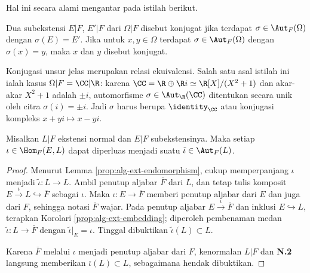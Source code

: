 Hal ini secara alami mengantar pada istilah berikut.
\begin{definition}
	Dua subekstensi $E|F$, $E'|F$ dari $\Omega|F$ disebut konjugat jika terdapat $\sigma \in \Aut_F(\Omega)$ dengan $\sigma(E)=E'$. Jika untuk $x, y \in \Omega$ terdapat $\sigma \in \Aut_F(\Omega)$ dengan $\sigma(x)=y$, maka $x$ dan $y$ disebut konjugat.
\end{definition}
Konjugasi unsur jelas merupakan relasi ekuivalensi. Salah satu asal istilah ini ialah kasus $\Omega|F = \CC|\R$: karena $\CC = \R \oplus \R i \simeq \R[X]/(X^2+1)$ dan akar-akar $X^2+1$ adalah $\pm i$, automorfisme $\sigma \in \Aut_{\R}(\CC)$ ditentukan secara unik oleh citra $\sigma(i) = \pm i$. Jadi $\sigma$ harus berupa $\identity_{\CC}$ atau konjugasi kompleks $x + yi \mapsto x - yi$.

\begin{proposition}\label{prop:normal-ext-prolongation}
	Misalkan $L|F$ ekstensi normal dan $E|F$ subekstensinya. Maka setiap $\iota \in \Hom_F(E, L)$ dapat diperluas menjadi suatu $\tilde{\iota} \in \Aut_F(L)$.
\end{proposition}
\begin{proof}
	Menurut Lemma \ref{prop:alg-ext-endomorphism}, cukup memperpanjang $\iota$ menjadi $\tilde{\iota}: L \to L$. Ambil penutup aljabar $\overline{F}$ dari $L$, dan tetap tulis komposit $E \xrightarrow{\iota} L \hookrightarrow \overline{F}$ sebagai $\iota$. Maka $\iota: E \to \overline{F}$ memberi penutup aljabar dari $E$ dan juga dari $F$, sehingga notasi $\overline{F}$ wajar. Pada penutup aljabar $E \xrightarrow{\iota} \overline{F}$ dan inklusi $E \hookrightarrow L$, terapkan Korolari \ref{prop:alg-ext-embedding}; diperoleh pembenaman medan $\tilde{\iota}: L \to \overline{F}$ dengan $\tilde{\iota}|_E = \iota$. Tinggal dibuktikan $\tilde{\iota}(L) \subset L$.

	Karena $\overline{F}$ melalui $\iota$ menjadi penutup aljabar dari $F$, kenormalan $L|F$ dan \textbf{N.2} langsung memberikan $\overline{\iota}(L) \subset L$, sebagaimana hendak dibuktikan.
\end{proof}

